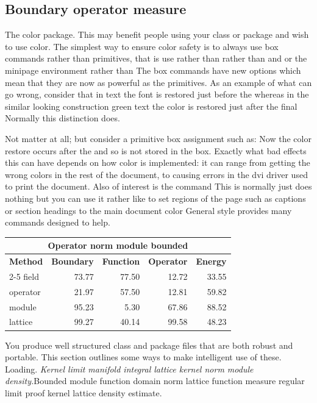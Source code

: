 \documentclass{article}
\begin{document}
\subsection{Boundary operator measure}
The color package. This may benefit people using your class or package and wish to use color. The simplest way to ensure color safety is to always use box commands rather than primitives, that is use rather than rather than and or the minipage environment rather than The box commands have new options which mean that they are now as powerful as the primitives. As an example of what can go wrong, consider that in text the font is restored just before the whereas in the similar looking construction green text the color is restored just after the final Normally this distinction does.

Not matter at all; but consider a primitive box assignment such as: Now the color restore occurs after the and so is not stored in the box. Exactly what bad effects this can have depends on how color is implemented: it can range from getting the wrong colors in the rest of the document, to causing errors in the dvi driver used to print the document. Also of interest is the command This is normally just does nothing but you can use it rather like to set regions of the page such as captions or section headings to the main document color General style provides many commands designed to help.
{\centering
\begin{tabular}{l@{}rrrr}
\hline
\multicolumn{5}{c}{\bfseries Operator norm module bounded} \\ \hline
\bfseries Method & \bfseries Boundary & \bfseries Function & \bfseries Operator & \bfseries Energy \\ \cline{2-5}
field & 73.77 & 77.50 & 12.72 & 33.55 \\
operator & 21.97 & 57.50 & 12.81 & 59.82 \\
module & 95.23 & 5.30 & 67.86 & 88.52 \\
lattice & 99.27 & 40.14 & 99.58 & 48.23 \\
\hline
\end{tabular}
\par}
\noindent You produce well structured class and package files that are both robust and portable. This section outlines some ways to make intelligent use of these. Loading. {\itshape Kernel limit manifold integral lattice kernel norm module density.}\hspace{.05\textwidth}Bounded module function domain norm lattice function measure regular limit proof kernel lattice density estimate.
\end{document}
